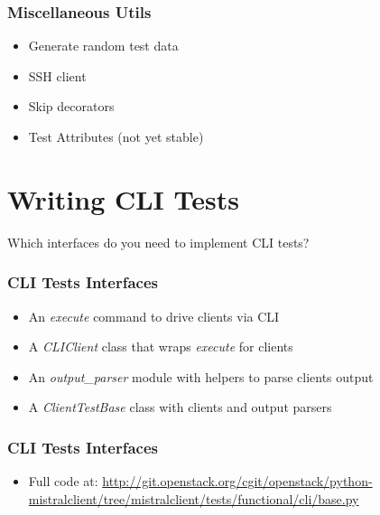 \documentclass[aspectratio=169,11pt,hyperref={colorlinks=true}]{beamer}
\begin{document}
\begin{frame}
    \frametitle{Miscellaneous Utils}
    \begin{itemize}
        \item Generate random test data
        \item SSH client
        \item Skip decorators
        \item Test Attributes (not yet stable)
    \end{itemize}
\end{frame}

\section{Writing CLI Tests}
\begin{frame}[c]
    \begin{center}
        \large Which interfaces do you need to implement CLI tests?
    \end{center}
\end{frame}

\begin{frame}
    \frametitle{CLI Tests Interfaces}
    \begin{itemize}
        \item An \emph{execute} command to drive clients via CLI
        \item A \emph{CLIClient} class that wraps \emph{execute} for clients
        \item An \emph{output\_parser} module with helpers to parse clients output
        \item A \emph{ClientTestBase} class with clients and output parsers
    \end{itemize}
\end{frame}

\begin{frame}
    \frametitle{CLI Tests Interfaces}
    
    \begin{itemize}
        \item \tiny Full code at: \href{http://git.openstack.org/cgit/openstack/python-mistralclient/tree/mistralclient/tests/functional/cli/base.py}{http://git.openstack.org/cgit/openstack/python-mistralclient/tree/mistralclient/tests/functional/cli/base.py}
    \end{itemize}
\end{frame}
\end{document}
